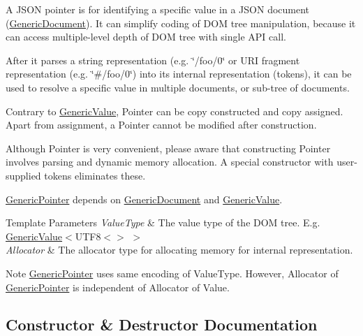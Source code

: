 A J\+S\+ON pointer is for identifying a specific value in a J\+S\+ON document (\hyperlink{class_generic_document}{Generic\+Document}). It can simplify coding of D\+OM tree manipulation, because it can access multiple-\/level depth of D\+OM tree with single A\+PI call.

After it parses a string representation (e.\+g. \char`\"{}/foo/0\char`\"{} or U\+RI fragment representation (e.\+g. \char`\"{}\#/foo/0\char`\"{}) into its internal representation (tokens), it can be used to resolve a specific value in multiple documents, or sub-\/tree of documents.

Contrary to \hyperlink{class_generic_value}{Generic\+Value}, Pointer can be copy constructed and copy assigned. Apart from assignment, a Pointer cannot be modified after construction.

Although Pointer is very convenient, please aware that constructing Pointer involves parsing and dynamic memory allocation. A special constructor with user-\/ supplied tokens eliminates these.

\hyperlink{class_generic_pointer}{Generic\+Pointer} depends on \hyperlink{class_generic_document}{Generic\+Document} and \hyperlink{class_generic_value}{Generic\+Value}.


\begin{DoxyTemplParams}{Template Parameters}
{\em Value\+Type} & The value type of the D\+OM tree. E.\+g. \hyperlink{class_generic_value}{Generic\+Value}$<$U\+T\+F8$<$$>$ $>$ \\
\hline
{\em Allocator} & The allocator type for allocating memory for internal representation.\\
\hline
\end{DoxyTemplParams}
\begin{DoxyNote}{Note}
\hyperlink{class_generic_pointer}{Generic\+Pointer} uses same encoding of Value\+Type. However, Allocator of \hyperlink{class_generic_pointer}{Generic\+Pointer} is independent of Allocator of Value. 
\end{DoxyNote}


\subsection{Constructor \& Destructor Documentation}
\mbox{\label{class_generic_pointer_a4ad549b8a826c3c2dedf03fcc07be9b0}} 
